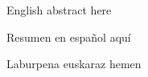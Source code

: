




\begin{abstracts}        %

English abstract here

\end{abstracts}

\begin{resumen}        %

Resumen en espa\~nol aqu\'i


\end{resumen}

\begin{laburpena}        %
 
 Laburpena euskaraz hemen
 
\end{laburpena}





